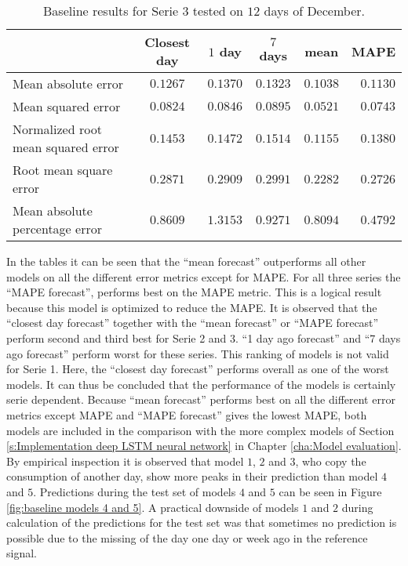 \begin{table}[ht]
	\centering
	\begin{tabular}{@{}l|ccccr@{}} \toprule
			& \textbf{Closest day} & \textbf{$ 1 $ day} & \textbf{$ 7 $ days} & \textbf{mean} & \textbf{MAPE}\\\midrule
		Mean absolute error& $0.1267 $&\cellcolor{red!25}$ 0.1370 $  & $0.1323 $ &\cellcolor{green!25} $ 0.1038 $ & $ 0.1130 $\\
		Mean squared error& $0.0824 $&$ 0.0846 $  & \cellcolor{red!25}$0.0895 $ & \cellcolor{green!25}$ 0.0521 $ & $ 0.0743 $\\
		Normalized root mean squared error& $0.1453 $&$ 0.1472$  & \cellcolor{red!25}$0.1514$ & \cellcolor{green!25}$ 0.1155$ & $ 0.1380$\\
		Root mean square error& $0.2871 $&$ 0.2909$  & \cellcolor{red!25}$0.2991$ & \cellcolor{green!25}$ 0.2282$ & $ 0.2726$\\
		Mean absolute percentage error & $ 0.8609 $&\cellcolor{red!25}$ 1.3153 $  & $ 0.9271 $ & $ 0.8094  $ &\cellcolor{green!25} $ 0.4792 $\\\bottomrule
	\end{tabular}
	\caption{Baseline results for Serie $ 3 $ tested on $ 12 $ days of December.}
	\label{tab:summ_data_serie3}
\end{table}

In the tables it can be seen that the ``mean forecast'' outperforms all other models on all the different error metrics except for MAPE. For all three series the ``MAPE forecast'', performs best on the MAPE metric. This is a logical result because this model is optimized to reduce the MAPE. It is observed that the ``closest day forecast'' together with the ``mean forecast'' or ``MAPE forecast'' perform second and third best for Serie 2 and 3. ``1 day ago forecast'' and ``7 days ago forecast'' perform worst for these series. This ranking of models is not valid for Serie 1. Here, the ``closest day forecast'' performs overall as one of the worst models. It can thus be concluded that the performance of the models is certainly serie dependent. Because ``mean forecast'' performs best on all the different error metrics except MAPE and ``MAPE forecast'' gives the lowest MAPE, both models are included in the comparison with the more complex models of Section \ref{s:Implementation deep LSTM neural network} in Chapter \ref{cha:Model evaluation}.\\

By empirical inspection it is observed that model $ 1 $, $ 2 $ and $ 3 $, who copy the consumption of another day, show more peaks in their prediction than model $ 4 $ and $ 5 $. Predictions during the test set of models $ 4 $ and $ 5 $ can be seen in Figure \ref{fig:baseline models 4 and 5}. A practical downside of models $ 1 $ and $ 2 $ during calculation of the predictions for the test set was that sometimes no prediction is possible due to the missing of the day one day or week ago in the reference signal.\\


